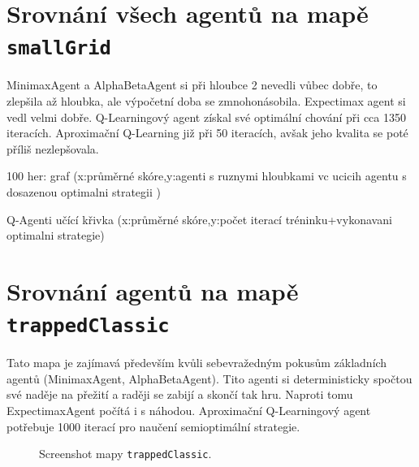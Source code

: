 \section{Srovnání všech agentů na mapě \texttt{smallGrid}} 
MinimaxAgent a AlphaBetaAgent si při hloubce 2 nevedli vůbec dobře, to zlepšila až hloubka, ale výpočetní doba se zmnohonásobila. Expectimax agent si vedl velmi dobře. Q-Learningový agent získal své optimální chování při cca 1350 iteracích. Aproximační Q-Learning již při 50 iteracích, avšak jeho kvalita se poté příliš nezlepšovala.

100 her: graf (x:průměrné skóre,y:agenti s ruznymi hloubkami vc ucicih agentu s dosazenou optimalni strategii )

Q-Agenti učící křivka (x:průměrné skóre,y:počet iterací tréninku+vykonavani optimalni strategie)

\section{Srovnání agentů na mapě \texttt{trappedClassic}}
Tato mapa je zajímavá především kvůli sebevražedným pokusům základních agentů (MinimaxAgent, AlphaBetaAgent). Tito agenti si deterministicky spočtou své naděje na přežití a raději se zabijí a skončí tak hru. Naproti tomu ExpectimaxAgent počítá i s náhodou. Aproximační Q-Learningový agent potřebuje 1000 iterací pro naučení semioptimální strategie.
\begin{figure}[!htbp]
\begin{center}
  \caption{Screenshot mapy \texttt{trappedClassic}.}
  \label{img:trapped}
\end{center}
\end{figure}

